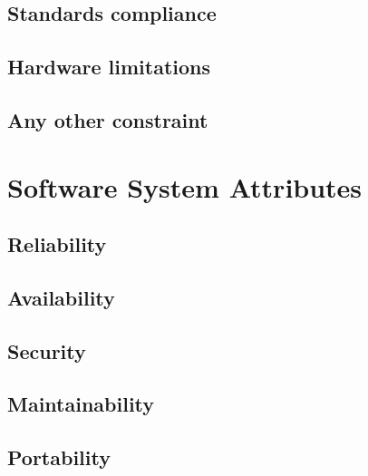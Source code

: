 \subsection{Standards compliance}
\subsection{Hardware limitations}
\subsection{Any other constraint}

\section{Software System Attributes}
\label{sec:Software System Attributes}%

\subsection{Reliability}
\subsection{Availability}
\subsection{Security}
\subsection{Maintainability}
\subsection{Portability}
